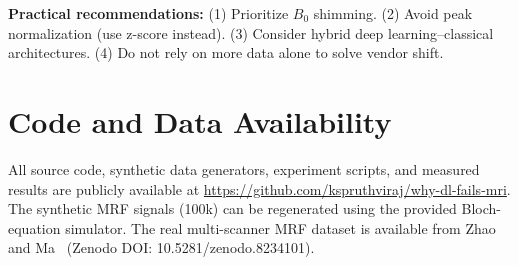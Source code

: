 \documentclass[11pt,a4paper]{article}
\begin{document}
\textbf{Practical recommendations:}
(1) Prioritize $B_0$ shimming.
(2) Avoid peak normalization (use z-score instead).
(3) Consider hybrid deep learning--classical architectures.
(4) Do not rely on more data alone to solve vendor shift.

\section*{Code and Data Availability}

All source code, synthetic data generators, experiment scripts, and
measured results are publicly available at
\url{https://github.com/kspruthviraj/why-dl-fails-mri}. The synthetic
MRF signals (100k) can be regenerated using the provided Bloch-equation
simulator. The real multi-scanner MRF dataset is available from
Zhao and Ma~\cite{zhao2023multiscanner} (Zenodo DOI:
10.5281/zenodo.8234101).




\end{document}
